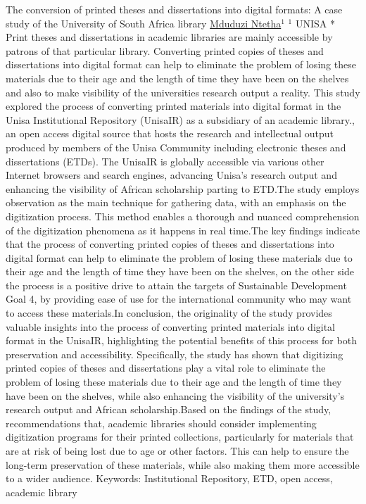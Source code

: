 
    \begin{abstract_online}{ The conversion of printed theses and dissertations into digital formats: A case study of the University of South Africa library}{%
        \underline{ Mduduzi Ntetha}$^{1}$}{%
        }{%
        $^1$  UNISA *\newline{}
            }
	Print theses and dissertations in academic libraries are mainly accessible by patrons of that particular library. Converting printed copies of theses and dissertations into digital format can help to eliminate the problem of losing these materials due to their age and the length of time they have been on the shelves and also to make visibility of the universities research output a reality. This study explored the process of converting printed materials into digital format in the Unisa Institutional Repository (UnisaIR) as a subsidiary of an academic library., an open access digital source that hosts the research and intellectual output produced by members of the Unisa Community including electronic theses and dissertations (ETDs). The UnisaIR is globally accessible via various other Internet browsers and search engines, advancing Unisa’s research output and enhancing the visibility of African scholarship parting to ETD.The study employs observation as the main technique for gathering data, with an emphasis on the digitization process. This method enables a thorough and nuanced comprehension of the digitization phenomena as it happens in real time.The key findings indicate that the process of converting printed copies of theses and dissertations into digital format can help to eliminate the problem of losing these materials due to their age and the length of time they have been on the shelves, on the other side the process is a positive drive to attain the targets of Sustainable Development Goal 4, by providing ease of use for the international community who may want to access these materials.In conclusion, the originality of the study provides valuable insights into the process of converting printed materials into digital format in the UnisaIR, highlighting the potential benefits of this process for both preservation and accessibility. Specifically, the study has shown that digitizing printed copies of theses and dissertations play a vital role to eliminate the problem of losing these materials due to their age and the length of time they have been on the shelves, while also enhancing the visibility of the university's research output and African scholarship.Based on the findings of the study, recommendations that, academic libraries should consider implementing digitization programs for their printed collections, particularly for materials that are at risk of being lost due to age or other factors. This can help to ensure the long-term preservation of these materials, while also making them more accessible to a wider audience. Keywords: Institutional Repository, ETD, open access, academic library 
    \end{abstract_online}
    
